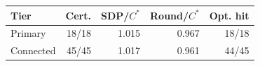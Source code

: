 \scriptsize
\setlength{\tabcolsep}{3pt}
\begin{tabular}{lrrrr}
\toprule
Tier & Cert. & SDP/$C^*$ & Round/$C^*$ & Opt. hit \\
\midrule
Primary & 18/18 & 1.015 & 0.967 & 18/18 \\
Connected & 45/45 & 1.017 & 0.961 & 44/45 \\
\bottomrule
\end{tabular}

